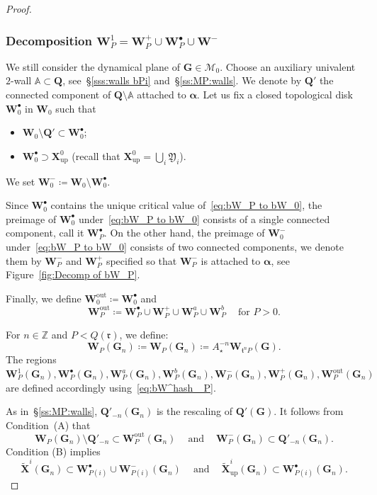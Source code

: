 \documentclass{amsart}
\renewcommand{\sp}{{\ \ }}
\newcommand{\1}{{\mathbb 1 }}
\newcommand\MM{\mathscr{M}}
\newcommand\bMM{{\pmb {\MM}}}
\newcommand{\bA}{{\mathbb{A}}}
\newcommand\frakY{{\mathfrak Y}}
\newcommand{\bX}{{\mathbf X}}
\newcommand{\bW}{{\mathbf W}}
\newcommand{\bQ}{{\mathbf Q}}
\newcommand{\bG}{{\mathbf G}}
\newcommand{\str}{{\star}}
\renewcommand{\tt}{\mathfrak{t}}
\newcommand{\rr}{\mathfrak{r}}
\newcommand\out{{\operatorname{out}}}
\newcommand\up{{\operatorname{up}}}
\newcommand{\Z}{\mathbb{Z}}
\theoremstyle{remark}
\numberwithin{equation}{section}
\theoremstyle{definition}
\newcommand{\balpha}{{\boldsymbol \alpha}}
\theoremstyle{nonumberbreak}
\begin{document}
\begin{proof}
\subsubsection{Decomposition $\bW^1_P=\bW^+_P\cup \bW_P^\bullet \cup \bW^-$} 
We still consider the dynamical plane of $\bG\in \bMM_0$. Choose an auxiliary univalent $2$-wall $\bA\subset \bQ$, see~\S\ref{sss:walls bPi} and~\S\ref{ss:MP:walls}. We denote by $\bQ'$ the connected component of $\bQ\setminus \bA$ attached to $\balpha$.  Let us fix a closed topological disk $\bW^\bullet_0 $ in $ \bW_0$ such that
\begin{itemize}
\item[(A)] $\bW_0 \setminus \bQ'\subset  \bW^\bullet_0$;
\item[(B)] $\displaystyle \bW^\bullet_0 \supset \bX^0_\up $ (recall that $\bX^0_\up =\bigcup_i \frakY_i$).
\end{itemize}
We set $\bW^-_0\coloneqq \bW_0\setminus \bW^\bullet_0$.

Since $\bW^\bullet_0$ contains the unique critical value of~\eqref{eq:bW_P to bW_0}, the preimage of $\bW^\bullet_0$ under~\eqref{eq:bW_P to bW_0} consists of a single connected component, call it  $\bW^\bullet_P$. On the other hand, the preimage of $\bW^-_0$ under~\eqref{eq:bW_P to bW_0}  consists of two connected components, we denote them by $\bW_P^-$ and $\bW_P^+$  specified so that $\bW_P^-$ is attached to $\balpha$, see Figure~\ref{fig:Decomp of bW_P}.

Finally, we define $\bW^\out_0\coloneqq \bW^\bullet _0$ and \[\bW_P^\out\coloneqq \bW^\bullet_P\cup \bW^+_P\cup \bW^a _P\cup \bW^b_P\sp\sp \text{ for }P>0.\]



For $n\in \Z$ and $P<Q(\rr)$, we define:
\begin{equation}
\label{eq:bW^hash _P}
 \bW_P(\bG_n) \coloneqq \bW_{ P} (\bG_n)\coloneqq A_\str ^{-n}\bW_{\tt^{n} P}( \bG).
\end{equation}
 The regions $\bW_P^1(\bG_n),\bW_P^\bullet(\bG_n), \bW_P^a(\bG_n), \bW_P^b(\bG_n), \bW_P^-(\bG_n),\bW_P^+(\bG_n), \bW_P^\out(\bG_n)$ are defined accordingly using~\eqref{eq:bW^hash _P}.


As in~\S\ref{ss:MP:walls}, $\bQ'_{-n}(\bG_n)$ is the rescaling of $\bQ'(\bG)$. It follows from Condition~(A) that
\[\bW_P(\bG_n) \setminus \bQ'_{-n}\subset  \bW^\out_P(\bG_n) \sp\sp\text{ and } \sp\sp \bW^-_P(\bG_n) \subset  \bQ'_{-n}(\bG_n).\]
Condition (B) implies 
\begin{equation}
\label{eq:bX^i is in bWbullet}
\widetilde \bX^i(\bG_n) \subset \bW_{P(i)}^\bullet\cup \bW_{P(i)}^- (\bG_n)\sp\sp \text{ and }\sp \sp   \widetilde\bX^i_\up(\bG_n) \subset \bW_{P(i)}^\bullet(\bG_n).
\end{equation}



\end{proof}
\end{document}
